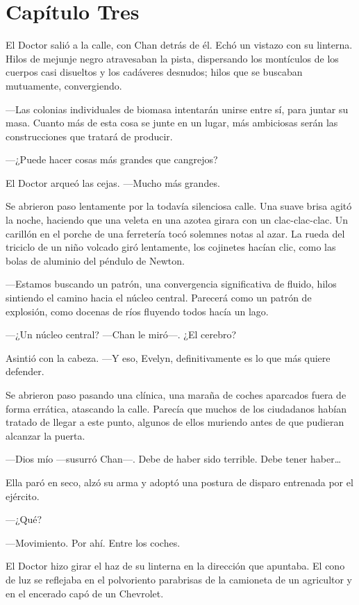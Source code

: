 \chapter*{Capítulo Tres}

El Doctor salió a la calle, con Chan detrás de él. Echó un vistazo con
su linterna. Hilos de mejunje negro atravesaban la pista, dispersando
los montículos de los cuerpos casi disueltos y los cadáveres desnudos;
hilos que se buscaban mutuamente, convergiendo.

---Las colonias individuales de biomasa intentarán unirse entre sí, para
juntar su masa. Cuanto más de esta cosa se junte en un lugar, más
ambiciosas serán las construcciones que tratará de producir.

---¿Puede hacer cosas más grandes que cangrejos?

El Doctor arqueó las cejas. ---Mucho más grandes.

Se abrieron paso lentamente por la todavía silenciosa calle. Una suave
brisa agitó la noche, haciendo que una veleta en una azotea girara con
un clac-clac-clac. Un carillón en el porche de una ferretería tocó
solemnes notas al azar. La rueda del triciclo de un niño volcado giró
lentamente, los cojinetes hacían clic, como las bolas de aluminio del
péndulo de Newton.

---Estamos buscando un patrón, una convergencia significativa de fluido,
hilos sintiendo el camino hacia el núcleo central. Parecerá como un
patrón de explosión, como docenas de ríos fluyendo todos hacía un lago.

---¿Un núcleo central? ---Chan le miró---. ¿El cerebro?

Asintió con la cabeza. ---Y eso, Evelyn, definitivamente es lo que más
quiere defender.

Se abrieron paso pasando una clínica, una maraña de coches aparcados
fuera de forma errática, atascando la calle. Parecía que muchos de los
ciudadanos habían tratado de llegar a este punto, algunos de ellos
muriendo antes de que pudieran alcanzar la puerta.

---Dios mío ---susurró Chan---. Debe de haber sido terrible. Debe tener
haber\ldots{}

Ella paró en seco, alzó su arma y adoptó una postura de disparo
entrenada por el ejército.

---¿Qué?

---Movimiento. Por ahí. Entre los coches.

El Doctor hizo girar el haz de su linterna en la dirección que apuntaba.
El cono de luz se reflejaba en el polvoriento parabrisas de la camioneta
de un agricultor y en el encerado capó de un Chevrolet.

